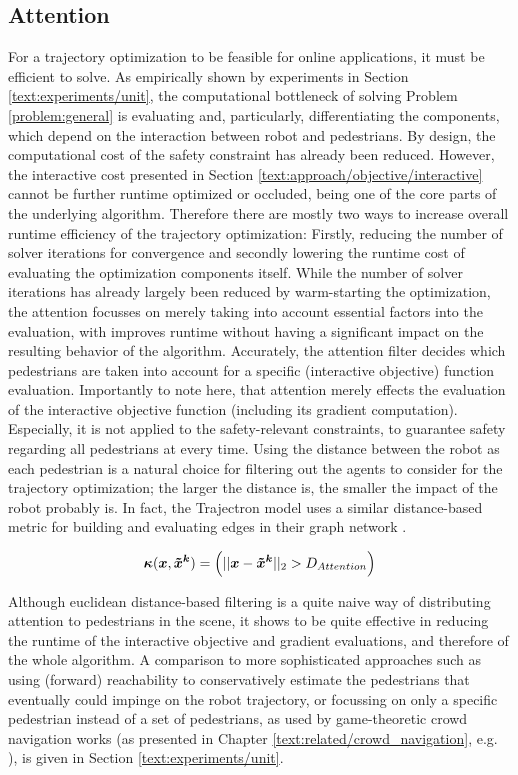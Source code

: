 \subsection{Attention}
\label{text:approach/runtime/filtering}
For a trajectory optimization to be feasible for online applications, it must be efficient to solve. As empirically shown by experiments in Section \ref{text:experiments/unit}, the computational bottleneck of solving Problem \ref{problem:general} is evaluating and, particularly, differentiating the components, which depend on the interaction between robot and pedestrians. By design, the computational cost of the safety constraint has already been reduced. However, the interactive cost presented in Section \ref{text:approach/objective/interactive} cannot be further runtime optimized or occluded, being one of the core parts of the underlying algorithm. Therefore there are mostly two ways to increase overall runtime efficiency of the trajectory optimization: Firstly, reducing the number of solver iterations for convergence and secondly lowering the runtime cost of evaluating the optimization components itself.
\newline
While the number of solver iterations has already largely been reduced by warm-starting the optimization, the attention focusses on merely taking into account essential factors into the evaluation, with improves runtime without having a significant impact on the resulting behavior of the algorithm. Accurately, the attention filter decides which pedestrians are taken into account for a specific (interactive objective) function evaluation. Importantly to note here, that attention merely effects the evaluation of the interactive objective function (including its gradient computation). Especially, it is not applied to the safety-relevant constraints, to guarantee safety regarding all pedestrians at every time.    
\newline
Using the distance between the robot as each pedestrian is a natural choice for filtering out the agents to consider for the trajectory optimization; the larger the distance is, the smaller the impact of the robot probably is. In fact, the Trajectron model uses a similar distance-based metric for building and evaluating edges in their graph network \cite{Salzmann2020}.

\begin{equation}
\attention(\x, \xped[k]) = \left( ||\x - \xped[k]||_2 > D_{Attention} \right)
\end{equation}

Although euclidean distance-based filtering is a quite naive way of distributing attention to pedestrians in the scene, it shows to be quite effective in reducing the runtime of the interactive objective and gradient evaluations, and therefore of the whole algorithm. A comparison to more sophisticated approaches such as using (forward) reachability to conservatively estimate the pedestrians that eventually could impinge on the robot trajectory, or focussing on only a specific pedestrian instead of a set of pedestrians, as used by game-theoretic crowd navigation works (as presented in Chapter \ref{text:related/crowd_navigation}, e.g.\,  \cite{Bouzat2014}\cite{Nikolaidis2017}), is given in Section \ref{text:experiments/unit}.
